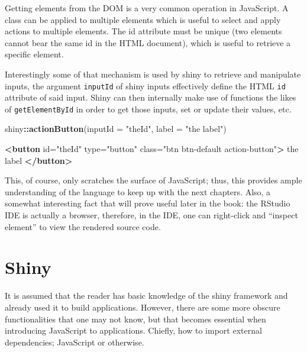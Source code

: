 \documentclass[10pt,]{krantz}
\makeatletter
\newenvironment{Shaded}{\begin{snugshade}}{\end{snugshade}}
\newcommand{\DataTypeTok}[1]{\textcolor[rgb]{0.27,0.27,0.27}{#1}}
\newcommand{\KeywordTok}[1]{\textcolor[rgb]{0.27,0.27,0.27}{\textbf{#1}}}
\newcommand{\NormalTok}[1]{#1}
\newcommand{\OperatorTok}[1]{\textcolor[rgb]{0.43,0.43,0.43}{\textbf{#1}}}
\newcommand{\OtherTok}[1]{\textcolor[rgb]{0.37,0.37,0.37}{#1}}
\newcommand{\StringTok}[1]{\textcolor[rgb]{0.5,0.5,0.5}{#1}}
\newenvironment{kframe}{%
\medskip{}
\setlength{\fboxsep}{.8em}
 \def\at@end@of@kframe{}%
 \ifinner\ifhmode%
  \def\at@end@of@kframe{\end{minipage}}%
  \begin{minipage}{\columnwidth}%
 \fi\fi%
 \def\FrameCommand##1{\hskip\@totalleftmargin \hskip-\fboxsep
 \colorbox{shadecolor}{##1}\hskip-\fboxsep
     \hskip-\linewidth \hskip-\@totalleftmargin \hskip\columnwidth}%
 \MakeFramed {\advance\hsize-\width
   \@totalleftmargin\z@ \linewidth\hsize
   \@setminipage}}%
 {\par\unskip\endMakeFramed%
 \at@end@of@kframe}
\renewenvironment{Shaded}{\begin{kframe}}{\end{kframe}}
\makeatother
\begin{document}
Getting elements from the DOM is a very common operation in JavaScript. A class can be applied to multiple elements which is useful to select and apply actions to multiple elements. The id attribute must be unique (two elements cannot bear the same id in the HTML document), which is useful to retrieve a specific element.

Interestingly some of that mechanism is used by shiny to retrieve and manipulate inputs, the argument \texttt{inputId} of shiny inputs effectively define the HTML \texttt{id} attribute of said input. Shiny can then internally make use of functions the likes of \texttt{getElementById} in order to get those inputs, set or update their values, etc.

\begin{Shaded}
\begin{Highlighting}[]
\NormalTok{shiny}\OperatorTok{::}\KeywordTok{actionButton}\NormalTok{(}\DataTypeTok{inputId =} \StringTok{"theId"}\NormalTok{, }\DataTypeTok{label =} \StringTok{"the label"}\NormalTok{) }
\end{Highlighting}
\end{Shaded}

\begin{Shaded}
\begin{Highlighting}[]
\KeywordTok{<button} 
\OtherTok{  id=}\StringTok{"theId"} 
\OtherTok{  type=}\StringTok{"button"} 
\OtherTok{  class=}\StringTok{"btn btn-default action-button"}\KeywordTok{>}
\NormalTok{  the label}
\KeywordTok{</button>}
\end{Highlighting}
\end{Shaded}

This, of course, only scratches the surface of JavaScript; thus, this provides ample understanding of the language to keep up with the next chapters. Also, a somewhat interesting fact that will prove useful later in the book: the RStudio IDE is actually a browser, therefore, in the IDE, one can right-click and ``inspect element'' to view the rendered source code.

\hypertarget{basics-shiny}{%
\section{Shiny}\label{basics-shiny}}

It is assumed that the reader has basic knowledge of the shiny framework and already used it to build applications. However, there are some more obscure functionalities that one may not know, but that becomes essential when introducing JavaScript to applications. Chiefly, how to import external dependencies; JavaScript or otherwise.
\end{document}
